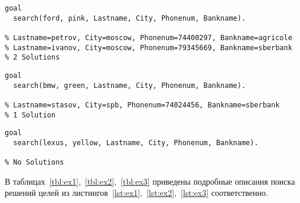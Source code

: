 \begin{lstlisting}[caption={Пример \textnumero1},label={lst:ex1}]
goal
  search(ford, pink, Lastname, City, Phonenum, Bankname).

% Lastname=petrov, City=moscow, Phonenum=74400297, Bankname=agricole
% Lastname=ivanov, City=moscow, Phonenum=79345669, Bankname=sberbank
% 2 Solutions
\end{lstlisting}

\begin{lstlisting}[caption={Пример \textnumero2},label={lst:ex2}]
goal
  search(bmw, green, Lastname, City, Phonenum, Bankname).

% Lastname=stasov, City=spb, Phonenum=74024456, Bankname=sberbank
% 1 Solution
\end{lstlisting}

\begin{lstlisting}[caption={Пример \textnumero3},label={lst:ex3}]
goal
  search(lexus, yellow, Lastname, City, Phonenum, Bankname).

% No Solutions
\end{lstlisting}

В таблицах~\ref{tbl:ex1},~\ref{tbl:ex2},~\ref{tbl:ex3} приведены подробные описания поиска решений целей из листингов~\ref{lst:ex1},~\ref{lst:ex2},~\ref{lst:ex3} соответственно.

